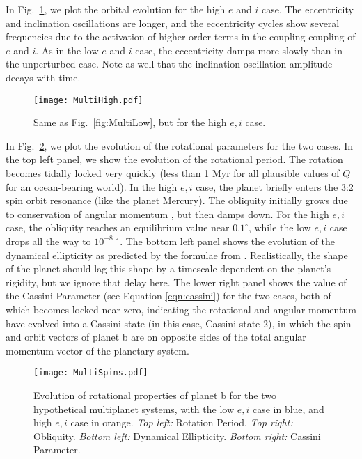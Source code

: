\documentclass[preprint,12pt]{aastex}
\begin{document}
In Fig.~\ref{fig:MultiHigh}, we plot the orbital evolution for the
high $e$ and $i$ case. The eccentricity and inclination oscillations
are longer, and the eccentricity cycles show several frequencies due
to the activation of higher order terms in the coupling coupling of $e$ and
$i$. As in the low $e$ and $i$ case, the eccentricity damps more
slowly than in the unperturbed case. Note as well that the inclination
oscillation amplitude decays with time.

\begin{figure} 
\begin{center}
\texttt{[image: MultiHigh.pdf]}
\end{center}
\caption{Same as Fig.~\ref{fig:MultiLow}, but for the high $e,i$ case.}
\label{fig:MultiHigh}
\end{figure}

In Fig.~\ref{fig:MultiSpins}, we plot the evolution of the rotational
parameters for the two cases. In the top left panel, we show the
evolution of the rotational period. The rotation becomes tidally
locked very quickly (less than 1 Myr for all plausible values of $Q$
for an ocean-bearing world).  In the high $e,i$ case, the planet
briefly enters the 3:2 spin orbit resonance (like the planet Mercury).
The obliquity initially grows due to conservation of angular momentum
\citep{Correia08}, but then damps down. For the high $e,i$ case, the
obliquity reaches an equilibrium value near $0.1^\circ$, while the low
$e,i$ case drops all the way to $10^{-8~\circ}$. The bottom left panel
shows the evolution of the dynamical ellipticity as predicted by the
formulae from \cite{Atobe2007}.  Realistically, the shape of the
planet should lag this shape by a timescale dependent on the planet's
rigidity, but we ignore that delay here. The lower right panel shows the
value of the Cassini Parameter (see Equation \ref{eqn:cassini}) for
the two cases, both of which becomes locked near zero, indicating the
rotational and angular momentum have evolved into a Cassini state (in
this case, Cassini state 2), in which the spin and orbit vectors
of planet b are on opposite sides of the total angular momentum vector
of the planetary system.

\begin{figure} 
\begin{center}
\texttt{[image: MultiSpins.pdf]}
\end{center}
\caption{Evolution of rotational properties of planet b for the
 two hypothetical multiplanet systems, with the low $e,i$ case 
 in blue, and high $e,i$ case in orange. {\it Top left:} Rotation
 Period. {\it Top right:} Obliquity. {\it Bottom left:} Dynamical
 Ellipticity. {\it Bottom right:} Cassini Parameter.}
\label{fig:MultiSpins}
\end{figure}
\end{document}
